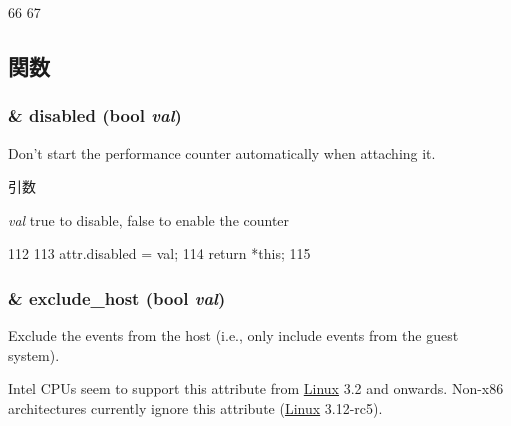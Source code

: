 \begin{DoxyCode}
66 {
67 }
\end{DoxyCode}


\subsection{関数}
\hypertarget{classPerfKvmCounterConfig_ae9f6708c8ac2d38d1a259442dacf5ef9}{
\subsubsection[{disabled}]{\& disabled (bool {\em val})}}
\label{classPerfKvmCounterConfig_ae9f6708c8ac2d38d1a259442dacf5ef9}
Don't start the performance counter automatically when attaching it.


\begin{DoxyParams}{引数}
\item[{\em val}]true to disable, false to enable the counter \end{DoxyParams}



\begin{DoxyCode}
112                                              {
113         attr.disabled = val;
114         return *this;
115     }
\end{DoxyCode}
\hypertarget{classPerfKvmCounterConfig_ae28830de9096ce653714c860182aa1ea}{
\subsubsection[{exclude\_\-host}]{\& exclude\_\-host (bool {\em val})}}
\label{classPerfKvmCounterConfig_ae28830de9096ce653714c860182aa1ea}
Exclude the events from the host (i.e., only include events from the guest system).

Intel CPUs seem to support this attribute from \hyperlink{classLinux}{Linux} 3.2 and onwards. Non-\/x86 architectures currently ignore this attribute (\hyperlink{classLinux}{Linux} 3.12-\/rc5).

